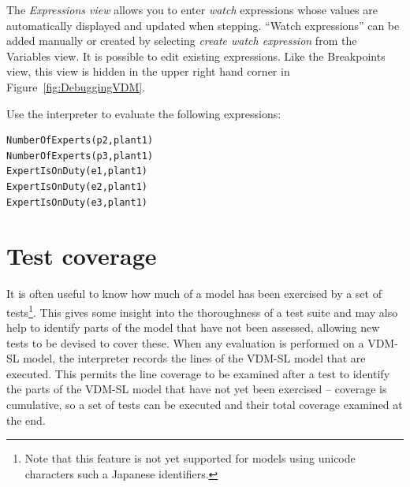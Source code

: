 The \emph{Expressions view} allows you to enter \emph{watch}
expressions whose values are automatically displayed and updated when
stepping. ``Watch expressions'' can be added manually or created by
selecting \emph{create watch expression} from the Variables view. It
is possible to edit existing expressions.  Like the Breakpoints view,
this view is hidden in the upper right hand corner in
Figure~\ref{fig:DebuggingVDM}.


\begin{myexercise}
\label{ex:tool-monitor}Use the interpreter to evaluate the
  following expressions:
\begin{lstlisting}
NumberOfExperts(p2,plant1)
NumberOfExperts(p3,plant1)
ExpertIsOnDuty(e1,plant1)
ExpertIsOnDuty(e2,plant1)
ExpertIsOnDuty(e3,plant1)
\end{lstlisting}
\end{myexercise}


\section{Test coverage}\label{sec:testcov}

It is often useful to know how much of a model has been exercised by a
set of tests\footnote{Note that this feature is not yet supported for
  models using unicode characters such a Japanese identifiers.}. 
This gives some insight into the thoroughness of a test
suite and may also help to identify parts of the model that have not
been assessed, allowing new tests to be devised to cover these. When
any evaluation is performed on a VDM-SL model, the interpreter records
the lines of the VDM-SL model that are executed. This permits the line
coverage to be examined after a test to identify the parts of the
VDM-SL model that have not yet been exercised -- coverage is
cumulative, so a set of tests can be executed and their total coverage
examined at the end.

